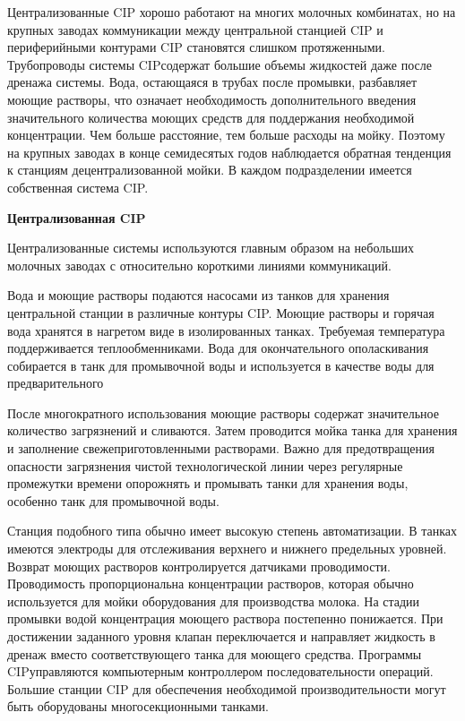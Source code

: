 \documentclass[a4paper,12pt,oneside]{extarticle}
\begin{document}
\begin{flushleft}
		Централизованные CIP хорошо работают на многих молочных комбинатах, но на крупных заводах коммуникации между центральной станцией CIP и периферийными контурами CIP становятся слишком протяженными. Трубопроводы системы CIPсодержат большие объемы жидкостей даже после дренажа системы. Вода, остающаяся в трубах после промывки, разбавляет моющие растворы, что означает необходимость дополнительного введения значительного количества моющих средств для поддержания необходимой концентрации. Чем больше расстояние, тем больше расходы на мойку. Поэтому на крупных заводах в конце семидесятых годов наблюдается обратная тенденция к станциям децентрализованной мойки. В каждом подразделении имеется собственная система CIP. 
\end{flushleft}	

\begin{flushleft}
	\bfseries 	Централизованная CIP
\end{flushleft}	

\begin{flushleft}
Централизованные системы используются главным образом на небольших молочных заводах с относительно короткими линиями коммуникаций.
\end{flushleft}

\begin{flushleft}
	Вода и моющие растворы подаются насосами из танков для хранения центральной станции в различные контуры CIP.
	Моющие растворы и горячая вода хранятся в нагретом виде в изолированных танках. Требуемая температура поддерживается теплообменниками. Вода для окончательного ополаскивания собирается в танк для промывочной воды и используется в качестве воды для предварительного
\end{flushleft}

\begin{flushleft}
После многократного использования моющие растворы содержат значительное количество загрязнений и сливаются. Затем проводится мойка танка для хранения и заполнение свежеприготовленными растворами. Важно для предотвращения опасности загрязнения чистой технологической линии через регулярные промежутки времени опорожнять и промывать танки для хранения воды, особенно танк для промывочной воды.
\end{flushleft}	

\begin{flushleft}
	Станция подобного типа обычно имеет высокую степень автоматизации. В танках имеются электроды для отслеживания верхнего и нижнего предельных уровней. Возврат моющих растворов контролируется датчиками проводимости. Проводимость пропорциональна концентрации растворов, которая обычно используется для мойки оборудования для производства молока. На стадии промывки водой концентрация моющего раствора постепенно понижается. При достижении заданного уровня клапан переключается и направляет жидкость в дренаж вместо соответствующего танка для моющего средства. Программы CIPуправляются компьютерным контроллером последовательности операций. Большие станции CIP для обеспечения необходимой производительности могут быть оборудованы многосекционными танками.
\end{flushleft}
	      
\end{document}
